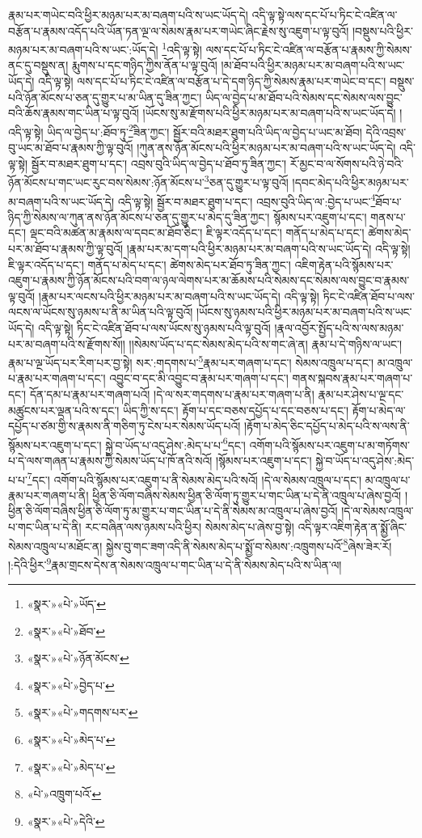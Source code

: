 རྣམ་པར་གཡེང་བའི་ཕྱིར་མཉམ་པར་མ་བཞག་པའི་ས་ཡང་ཡོད་དེ། འདི་ལྟ་སྟེ་ལས་དང་པོ་པ་ཏིང་ངེ་འཛིན་ལ་བརྩོན་པ་རྣམས་འདོད་པའི་ཡོན་ཏན་ལྔ་ལ་སེམས་རྣམ་པར་གཡེང་ཞིང་རྗེས་སུ་འཇུག་པ་ལྟ་བུའོ། །བསྡུས་པའི་ཕྱིར་མཉམ་པར་མ་བཞག་པའི་ས་ཡང་:ཡོད་དེ། \footnote{«སྣར་»«པེ་»ཡོད་}འདི་ལྟ་སྟེ། ལས་དང་པོ་པ་ཏིང་ངེ་འཛིན་ལ་བརྩོན་པ་རྣམས་ཀྱི་སེམས་ནང་དུ་བསྡུས་ན། རྨུགས་པ་དང་གཉིད་ཀྱིས་ནོན་པ་ལྟ་བུའོ། །མ་ཐོབ་པའི་ཕྱིར་མཉམ་པར་མ་བཞག་པའི་ས་ཡང་ཡོད་དེ། འདི་ལྟ་སྟེ། ལས་དང་པོ་པ་ཏིང་ངེ་འཛིན་ལ་བརྩོན་པ་དེ་དག་ཉིད་ཀྱི་སེམས་རྣམ་པར་གཡེང་བ་དང་། བསྡུས་པའི་ཉོན་མོངས་པ་ཅན་དུ་གྱུར་པ་མ་ཡིན་དུ་ཟིན་ཀྱང་། ཡིད་ལ་བྱེད་པ་མ་ཐོབ་པའི་སེམས་དང་སེམས་ལས་བྱུང་བའི་ཆོས་རྣམས་གང་ཡིན་པ་ལྟ་བུའོ། །ཡོངས་སུ་མ་རྫོགས་པའི་ཕྱིར་མཉམ་པར་མ་བཞག་པའི་ས་ཡང་ཡོད་དེ། །འདི་ལྟ་སྟེ། ཡིད་ལ་བྱེད་པ་:ཐོབ་ཏུ་\footnote{«སྣར་»«པེ་»ཐོབ་}ཟིན་ཀྱང་། སྦྱོར་བའི་མཐར་ཐུག་པའི་ཡིད་ལ་བྱེད་པ་ཡང་མ་ཐོབ། དེའི་འབྲས་བུ་ཡང་མ་ཐོབ་པ་རྣམས་ཀྱི་ལྟ་བུའོ། །ཀུན་ནས་ཉོན་མོངས་པའི་ཕྱིར་མཉམ་པར་མ་བཞག་པའི་ས་ཡང་ཡོད་དེ། འདི་ལྟ་སྟེ། སྦྱོར་བ་མཐར་ཐུག་པ་དང་། འབྲས་བུའི་ཡིད་ལ་བྱེད་པ་ཐོབ་ཏུ་ཟིན་ཀྱང་། རོ་མྱང་བ་ལ་སོགས་པའི་ཉེ་བའི་ཉོན་མོངས་པ་གང་ཡང་རུང་བས་སེམས་:ཉོན་མོངས་པ་\footnote{«སྣར་»«པེ་»ཉོན་མོངས་}ཅན་དུ་གྱུར་པ་ལྟ་བུའོ། །དབང་མེད་པའི་ཕྱིར་མཉམ་པར་མ་བཞག་པའི་ས་ཡང་ཡོད་དེ། འདི་ལྟ་སྟེ། སྦྱོར་བ་མཐར་ཐུག་པ་དང་། འབྲས་བུའི་ཡིད་ལ་:བྱེད་པ་ཡང་\footnote{«སྣར་»«པེ་»བྱེད་པ་}ཐོབ་པ་ཉིད་ཀྱི་སེམས་ལ་ཀུན་ནས་ཉོན་མོངས་པ་ཅན་དུ་གྱུར་པ་མེད་དུ་ཟིན་ཀྱང་། སྙོམས་པར་འཇུག་པ་དང་། གནས་པ་དང་། ལྡང་བའི་མཚན་མ་རྣམས་ལ་དབང་མ་ཐོབ་ཅིང་། ཇི་ལྟར་འདོད་པ་དང་། གནོད་པ་མེད་པ་དང་། ཚེགས་མེད་པར་མ་ཐོབ་པ་རྣམས་ཀྱི་ལྟ་བུའོ། །རྣམ་པར་མ་དག་པའི་ཕྱིར་མཉམ་པར་མ་བཞག་པའི་ས་ཡང་ཡོད་དེ། འདི་ལྟ་སྟེ། ཇི་ལྟར་འདོད་པ་དང་། གནོད་པ་མེད་པ་དང་། ཚེགས་མེད་པར་ཐོབ་ཏུ་ཟིན་ཀྱང་། འཇིག་རྟེན་པའི་སྙོམས་པར་འཇུག་པ་རྣམས་ཀྱི་ཉོན་མོངས་པའི་བག་ལ་ཉལ་ལེགས་པར་མ་ཆོམས་པའི་སེམས་དང་སེམས་ལས་བྱུང་བ་རྣམས་ལྟ་བུའོ། །རྣམ་པར་ལངས་པའི་ཕྱིར་མཉམ་པར་མ་བཞག་པའི་ས་ཡང་ཡོད་དེ། འདི་ལྟ་སྟེ། ཏིང་ངེ་འཛིན་ཐོབ་པ་ལས་ལངས་ལ་ཡོངས་སུ་ཉམས་པ་ནི་མ་ཡིན་པའི་ལྟ་བུའོ། །ཡོངས་སུ་ཉམས་པའི་ཕྱིར་མཉམ་པར་མ་བཞག་པའི་ས་ཡང་ཡོད་དེ། འདི་ལྟ་སྟེ། ཏིང་ངེ་འཛིན་ཐོབ་པ་ལས་ཡོངས་སུ་ཉམས་པའི་ལྟ་བུའོ། །རྣལ་འབྱོར་སྤྱོད་པའི་ས་ལས་མཉམ་པར་མ་བཞག་པའི་ས་རྫོགས་སོ།། །།སེམས་ཡོད་པ་དང་སེམས་མེད་པའི་ས་གང་ཞེ་ན། རྣམ་པ་དེ་གཉིས་ལ་ཡང་། རྣམ་པ་ལྔ་ཡོད་པར་རིག་པར་བྱ་སྟེ། སར་:གདགས་པ་\footnote{«སྣར་»«པེ་»གདགས་པར་}རྣམ་པར་གཞག་པ་དང་། སེམས་འཁྲུལ་པ་དང་། མ་འཁྲུལ་པ་རྣམ་པར་གཞག་པ་དང་། འབྱུང་བ་དང་མི་འབྱུང་བ་རྣམ་པར་གཞག་པ་དང་། གནས་སྐབས་རྣམ་པར་གཞག་པ་དང་། དོན་དམ་པ་རྣམ་པར་གཞག་པའོ། །དེ་ལ་སར་གདགས་པ་རྣམ་པར་གཞག་པ་ནི། རྣམ་པར་ཤེས་པ་ལྔ་དང་མཚུངས་པར་ལྡན་པའི་ས་དང་། ཡིད་ཀྱི་ས་དང་། རྟོག་པ་དང་བཅས་དཔྱོད་པ་དང་བཅས་པ་དང་། རྟོག་པ་མེད་ལ་དཔྱོད་པ་ཙམ་གྱི་ས་རྣམས་ནི་གཅིག་ཏུ་ངེས་པར་སེམས་ཡོད་པའོ། །རྟོག་པ་མེད་ཅིང་དཔྱོད་པ་མེད་པའི་ས་ལས་ནི་སྙོམས་པར་འཇུག་པ་དང་། སྐྱེ་བ་ཡོད་པ་འདུ་ཤེས་:མེད་པ་པ་\footnote{«སྣར་»«པེ་»མེད་པ་}དང་། འགོག་པའི་སྙོམས་པར་འཇུག་པ་མ་གཏོགས་པ་དེ་ལས་གཞན་པ་རྣམས་ཀྱི་སེམས་ཡོད་པ་ཁོ་ནའི་སའོ། །སྙོམས་པར་འཇུག་པ་དང་། སྐྱེ་བ་ཡོད་པ་འདུ་ཤེས་:མེད་པ་པ་\footnote{«སྣར་»«པེ་»མེད་པ་}དང་། འགོག་པའི་སྙོམས་པར་འཇུག་པ་ནི་སེམས་མེད་པའི་སའོ། །དེ་ལ་སེམས་འཁྲུལ་པ་དང་། མ་འཁྲུལ་པ་རྣམ་པར་གཞག་པ་ནི། ཕྱིན་ཅི་ལོག་བཞིས་སེམས་ཕྱིན་ཅི་ལོག་ཏུ་གྱུར་པ་གང་ཡིན་པ་དེ་ནི་འཁྲུལ་པ་ཞེས་བྱའོ། །ཕྱིན་ཅི་ལོག་བཞིས་ཕྱིན་ཅི་ལོག་ཏུ་མ་གྱུར་པ་གང་ཡིན་པ་དེ་ནི་སེམས་མ་འཁྲུལ་པ་ཞེས་བྱའོ། །དེ་ལ་སེམས་འཁྲུལ་པ་གང་ཡིན་པ་དེ་ནི། རང་བཞིན་ལས་ཉམས་པའི་ཕྱིར། སེམས་མེད་པ་ཞེས་བྱ་སྟེ། འདི་ལྟར་འཇིག་རྟེན་ན་སྨྱོ་ཞིང་སེམས་འཁྲུལ་པ་མཐོང་ན། སྐྱེས་བུ་གང་ཟག་འདི་ནི་སེམས་མེད་པ་སྨྱོ་བ་སེམས་:འཁྲུགས་པའོ་\footnote{«པེ་»འཁྲུག་པའོ་}ཞེས་ཟེར་རོ། །:དེའི་ཕྱིར་\footnote{«སྣར་»«པེ་»དེའི་}རྣམ་གྲངས་དེས་ན་སེམས་འཁྲུལ་པ་གང་ཡིན་པ་དེ་ནི་སེམས་མེད་པའི་ས་ཡིན་ལ། 
